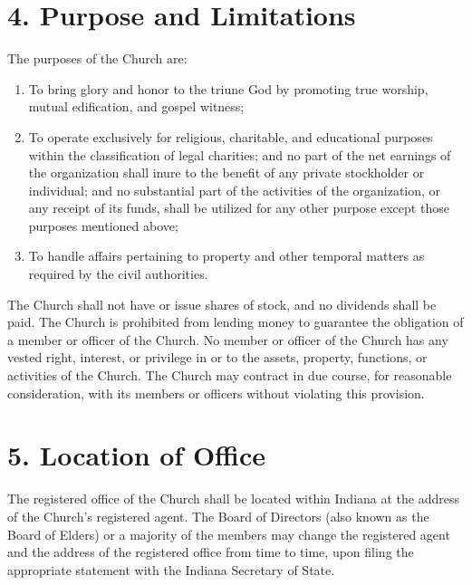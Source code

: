 \documentclass[
]{book}
\providecommand{\tightlist}{%
  \setlength{\itemsep}{0pt}\setlength{\parskip}{0pt}}
\begin{document}
\hypertarget{purpose-and-limitations}{%
\section*{4. Purpose and Limitations}\label{purpose-and-limitations}}

The purposes of the Church are:

\begin{enumerate}
\def\labelenumi{\alph{enumi}.}
\tightlist
\item
  To bring glory and honor to the triune God by promoting true worship, mutual edification, and gospel witness;
\item
  To operate exclusively for religious, charitable, and educational purposes within the classifica­tion of legal charities; and no part of the net earnings of the organization shall inure to the benefit of any private stockholder or individual; and no substantial part of the activities of the organization, or any receipt of its funds, shall be utilized for any other purpose except those purposes mentioned above;
\item
  To handle affairs pertaining to property and other temporal matters as required by the civil authorities.
\end{enumerate}

The Church shall not have or issue shares of stock, and no dividends shall be paid. The Church is prohibited from lending money to guarantee the obligation of a member or officer of the Church. No member or officer of the Church has any vested right, interest, or privilege in or to the assets, property, functions, or activities of the Church. The Church may contract in due course, for reasonable consideration, with its members or officers without violating this provision.

\hypertarget{location-of-office}{%
\section*{5. Location of Office}\label{location-of-office}}

The registered office of the Church shall be located within Indiana at the address of the Church's registered agent. The Board of Directors (also known as the Board of Elders) or a majority of the members may change the registered agent and the address of the registered office from time to time, upon filing the appropriate statement with the Indiana Secretary of State.
\end{document}
